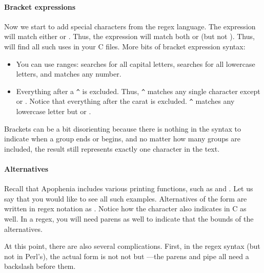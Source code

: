 
\paragraph{Bracket expressions} Now we start to add special characters
from the regex language. The expression \ci{[fs]} will match either
 or . Thus, the expression  will match both
 or  (but not ). Thus,  will find all such uses in your C files. More bits of
bracket expression syntax:

\begin{itemize}
\item You can use ranges: \ci{[A-Z]} searches for all capital letters,
\ci{[A-Za-z]} searches for all lowercase letters, and \ci{[0-9]} matches
any number. 
\item Everything after a \verb|^| is excluded. Thus, \ci{[}\verb|^|\ci{fs]} matches
any single character except  or . Notice that everything
after the carat is excluded. \ci{[a-z}\verb|^|\ci{fs]} matches any lowercase letter
but  or .
\end{itemize}
Brackets can be a bit disorienting because there is nothing in the syntax
to indicate when a group ends or begins, and no matter how many groups are
included, the result still represents exactly one character in the text.

\paragraph{Alternatives} 
Recall that Apophenia includes various printing functions, such as
 and . Let us say that you
would like to see all such examples. Alternatives of the form  are written in regex notation as . Notice how the \ci{|}
character also indicates  in C as well. In a regex, you will
need parens as well to indicate that the bounds of the alternatives.

At this point, there are also several complications. First, in the
 regex syntax (but not in Perl's), the actual form is not
not  but ---the
parens and pipe all need a backslash before them.

